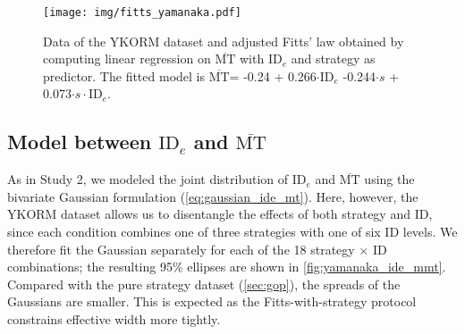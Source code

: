 \documentclass[acmlarge, manuscript,review]{acmart}
\newcommand{\mmt}{\ensuremath{\overline{\mt}}\xspace}
\newcommand{\mt}{\ensuremath{{\text{MT}}}\xspace}
\newcommand{\ide}{\ensuremath{{\text{ID}_e}}\xspace}
\begin{document}
\begin{figure}[htbp]
	\centering
	\texttt{[image: img/fitts\_yamanaka.pdf]}
	\caption{Data of the YKORM dataset and adjusted Fitts' law obtained by computing linear regression on \mmt with \ide and strategy as predictor. The fitted model is \mmt = -0.24 + 0.266$\cdot{}\ide$ -0.244$\cdot{}s$ + 0.073$\cdot{}s\cdot{}\ide$.}
	\label{fig:fitts_yamanaka}
\end{figure}




\subsection{Model between \ide and \mmt}
As in Study 2, we modeled the joint distribution of \ide and \mmt using the bivariate Gaussian formulation (\autoref{eq:gaussian_ide_mt}). Here, however, the YKORM dataset allows us to disentangle the effects of both strategy and ID, since each condition combines one of three strategies with one of six ID levels. We therefore fit the Gaussian separately for each of the 18 strategy $\times$ ID combinations; the resulting 95\% ellipses are shown in \autoref{fig:yamanaka_ide_mmt}.
Compared with the pure strategy dataset (\autoref{sec:gop}), the spreads of the Gaussians are smaller. This is expected as the Fitts-with-strategy protocol constrains effective width more tightly.
\end{document}
